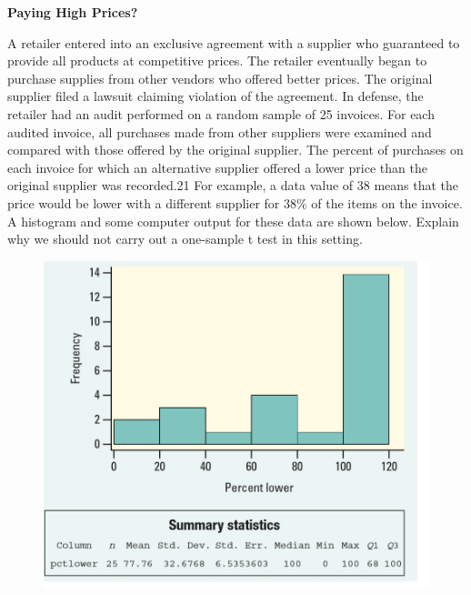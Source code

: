 \documentclass[a4paper, 12pt,twoside]{book}
\begin{document}
\colorbox{champagne}{\parbox{\textwidth}{
\textbf{Paying High Prices?}\vspace{0.3cm}

 A retailer entered into an exclusive agreement with a supplier who guaranteed to provide all products at competitive prices. The retailer eventually began to purchase supplies from other vendors who offered better prices. The original supplier filed a lawsuit claiming violation of the agreement. In defense, the retailer had an audit performed on a random sample of 25 invoices. For each audited invoice, all purchases made from other suppliers were examined and compared with those offered by the original supplier. The percent of purchases on each invoice for which an alternative supplier offered a lower price than the original supplier was recorded.21 For example, a data value of 38 means that the price would be lower with a different supplier for 38\% of the items on the invoice. A histogram and some computer output for these data are shown below. Explain why we should not carry out a one-sample t test in this setting.
 
 \begin{figure}[H]
 \centering
 \includegraphics[scale=0.6]{ExerciseForCheckingConditionsForOneTMean}
 \label{ExerciseForCheckingConditionsForOneTMean}
 \end{figure}
}}
\newpage
\end{document}

